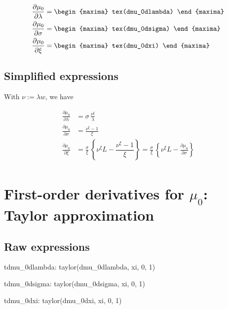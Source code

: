 {\color{MonVertF}
\begin{align*}
  \frac{\partial \mu_0}{\partial \lambda}
  &=
\begin{maxima}
  tex(dmu_0dlambda)
\end{maxima}\\
 \frac{\partial \mu_0}{\partial \sigma}
  &=
\begin{maxima}
  tex(dmu_0dsigma)
\end{maxima}\\
\frac{\partial \mu_0 }{\partial \xi}
  &=
\begin{maxima}
  tex(dmu_0dxi)
\end{maxima}
\end{align*}
}

\subsection*{Simplified expressions}
With $\nu := \lambda w$, we have

{\color{red}
\begin{align*}
  \frac{\partial \mu_0}{\partial \lambda}
  &= \sigma \, \frac{\nu^\xi}{\lambda}\\
 \frac{\partial \mu_0}{\partial \sigma}
  &= \frac{\nu^\xi-1}{\xi}\\
\frac{\partial \mu_0 }{\partial \xi}
  &= \frac{\sigma}{\xi} \, \left\{\nu^\xi L - \dfrac{\nu^\xi - 1}{\xi} \right\} =
  \frac{\sigma}{\xi} \, \left\{\nu^\xi L - \frac{\partial \mu_0}{\partial \sigma} \right\} \\
\end{align*}
}
\section{First-order derivatives for $\mu_0$: Taylor approximation}

\subsection*{Raw expressions}
\begin{maxima}
  tdmu_0dlambda: taylor(dmu_0dlambda, xi, 0, 1)
\end{maxima}
\begin{maxima}
  tdmu_0dsigma: taylor(dmu_0dsigma, xi, 0, 1)
\end{maxima}
\begin{maxima}
  tdmu_0dxi: taylor(dmu_0dxi, xi, 0, 1)
\end{maxima}

